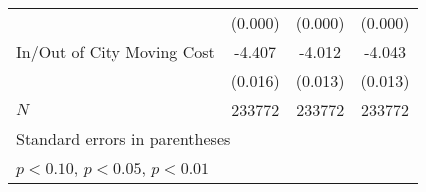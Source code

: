 {\begin{tabular}{l*{3}{c}}
            &     (0.000)         &     (0.000)         &     (0.000)         \\
In/Out of City Moving Cost&      -4.407\sym{***}&      -4.012\sym{***}&      -4.043\sym{***}\\
            &     (0.016)         &     (0.013)         &     (0.013)         \\
\hline
\(N\)       &      233772         &      233772         &      233772         \\
\hline\hline
\multicolumn{4}{l}{\footnotesize Standard errors in parentheses}\\
\multicolumn{4}{l}{\footnotesize \sym{*} \(p<0.10\), \sym{**} \(p<0.05\), \sym{***} \(p<0.01\)}\\
\end{tabular}
}
